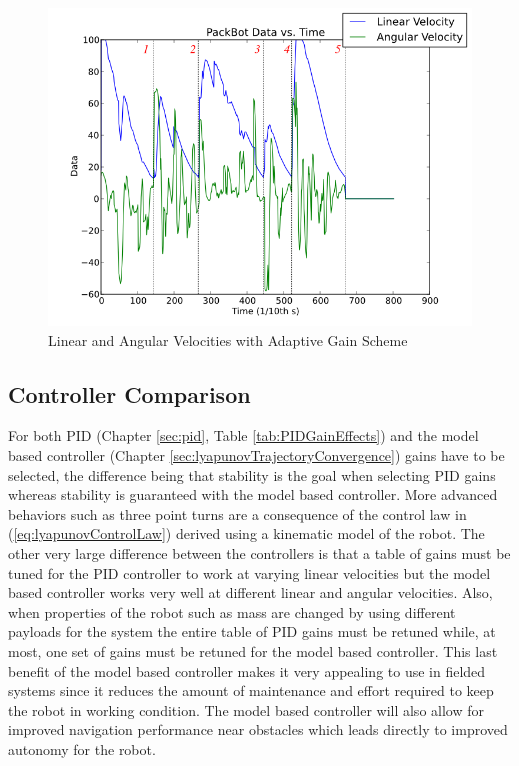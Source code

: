 \begin{figure}[ht!]
	\centering
	\includegraphics[width=.5\textwidth]{images/pbtx/20100929_1448_pbtx}
	\caption{Linear and Angular Velocities with Adaptive Gain Scheme}
	\label{fig:resultsLyapunovVelocitiesAdaptive}
\end{figure}

\subsection{Controller Comparison}
\label{sec:controllerComparison}
For both PID (Chapter \ref{sec:pid}, Table \ref{tab:PIDGainEffects}) and the model based controller (Chapter \ref{sec:lyapunovTrajectoryConvergence}) gains have to be selected, the difference being that stability is the goal when selecting PID gains whereas stability is guaranteed with the model based controller. More advanced behaviors such as three point turns are a consequence of the control law in (\ref{eq:lyapunovControlLaw}) derived using a kinematic model of the robot. The other very large difference between the controllers is that a table of gains must be tuned for the PID controller to work at varying linear velocities but the model based controller works very well at different linear and angular velocities. Also, when properties of the robot such as mass are changed by using different payloads for the system the entire table of PID gains must be retuned while, at most, one set of gains must be retuned for the model based controller. This last benefit of the model based controller makes it very appealing to use in fielded systems since it reduces the amount of maintenance and effort required to keep the robot in working condition. The model based controller will also allow for improved navigation performance near obstacles which leads directly to improved autonomy for the robot.

